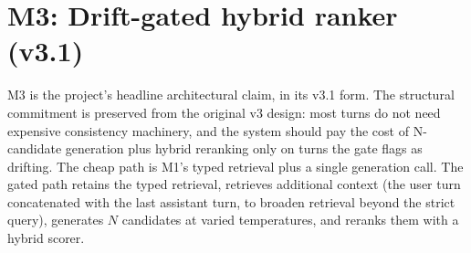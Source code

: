 \section{M3: Drift-gated hybrid ranker (v3.1)}

M3 is the project's headline architectural claim, in its v3.1 form. The structural commitment is preserved from the original v3 design: most turns do not need expensive consistency machinery, and the system should pay the cost of N-candidate generation plus hybrid reranking only on turns the gate flags as drifting. The cheap path is M1's typed retrieval plus a single generation call. The gated path retains the typed retrieval, retrieves additional context (the user turn concatenated with the last assistant turn, to broaden retrieval beyond the strict query), generates $N$ candidates at varied temperatures, and reranks them with a hybrid scorer.

